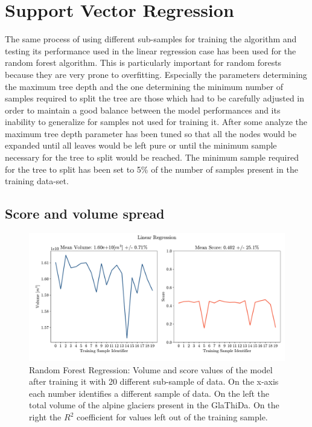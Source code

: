 \section{Support Vector Regression}\label{svr}
The same process of using different sub-samples for training the algorithm and testing its performance used in the linear regression case has been used for the random forest algorithm. This is particularly important for random forests because they are very prone to overfitting. Especially the parameters determining the maximum tree depth and the one determining the minimum number of samples required to split the tree are those which had to be carefully adjusted in order to maintain a good balance between the model performances and its inability to generalize for samples not used for training it. After some analyze the maximum tree depth parameter has been tuned so that all the nodes would be expanded until all leaves would be left pure or until the minimum sample necessary for the tree to split would be reached. The minimum sample required for the tree to split has been set to 5\% of the number of samples present in the training data-set.  

\subsection{Score and volume spread}\label{rfr-score}

\begin{figure}[!tp]
	\centering		  
	\includegraphics[width=1.\textwidth]{figures/LR_score.pdf}
	\caption{Random Forest Regression: Volume and score values of the model after training it with 20 different sub-sample of data. On the x-axis each number identifies a different sample of data. On the left the total volume of the alpine glaciers present in the GlaThiDa. On the right the $R^2$ coefficient for values left out of the training sample.}
	\label{fig:rfr-score}
\end{figure}


